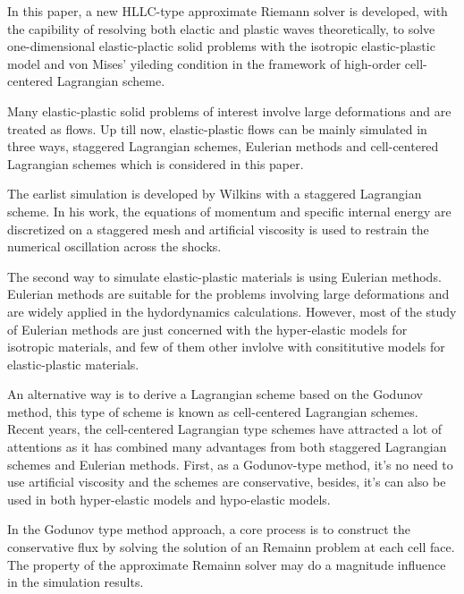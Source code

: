 \documentclass{article}
\theoremstyle{plain}\newtheorem{definition}{\sc{Definition}}
\theoremstyle{defination}\newtheorem{example}{Example}[section]
\numberwithin{equation}{section}
\numberwithin{table}{section}
\begin{document}
{In this paper, a new HLLC-type approximate Riemann solver is developed, with the capibility of resolving both elactic and plastic waves theoretically, to solve one-dimensional elastic-plactic solid problems with the isotropic elastic-plastic model and von Mises' yileding condition in the framework of high-order cell-centered Lagrangian scheme. 

Many elastic-plastic solid  problems of interest involve large deformations and are treated as flows. Up till now, elastic-plastic flows can be mainly simulated in three ways, staggered Lagrangian schemes, Eulerian methods and cell-centered Lagrangian schemes which is considered in this paper. 

The earlist simulation is developed by Wilkins with a staggered Lagrangian scheme. In his work, the equations of momentum and specific internal energy are discretized on a staggered mesh and  artificial viscosity is used to restrain  the  numerical oscillation across the shocks. 

The second way to simulate elastic-plastic materials is using  Eulerian methods. Eulerian methods are  suitable for the problems involving large deformations and are  widely applied in the hydordynamics calculations.  However, most of the study of Eulerian methods are just concerned with the hyper-elastic models for isotropic materials, and few of them other invlolve with consititutive models for elastic-plastic materials. 

An alternative way is to derive a Lagrangian scheme based on the Godunov method,  this type of scheme is known as cell-centered Lagrangian schemes.  Recent years, the cell-centered Lagrangian type schemes have attracted a lot of attentions as it has combined many advantages from both staggered Lagrangian schemes and Eulerian methods. First, as a Godunov-type method, it's no need to use artificial viscosity and the schemes are conservative, besides, it's can also be used in both  hyper-elastic models and hypo-elastic models.

In the  Godunov type method  approach,  a core process is to construct the conservative flux by solving  the solution of an  Remainn problem  at each cell face. The property of the  approximate Remainn solver may do a magnitude influence in the simulation results.      


}
\end{document}
